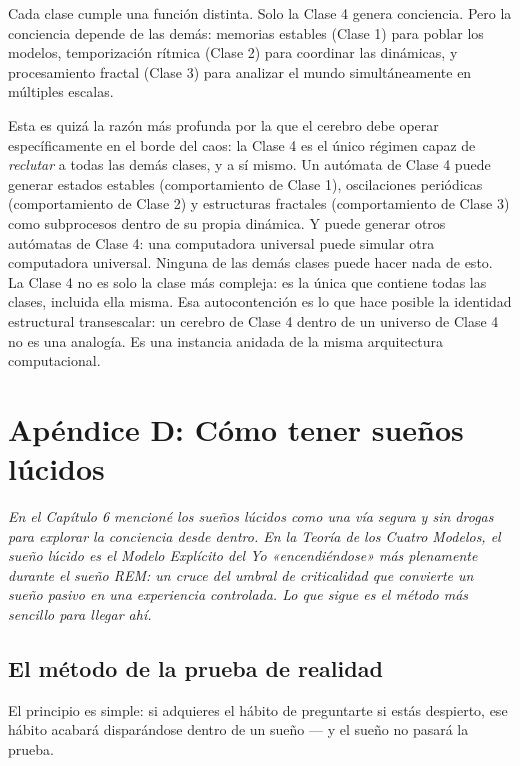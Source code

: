 \documentclass[11pt, twoside, openright]{book}
\begin{document}
Cada clase cumple una función distinta. Solo la Clase 4 genera conciencia. Pero la conciencia depende de las demás: memorias estables (Clase 1) para poblar los modelos, temporización rítmica (Clase 2) para coordinar las dinámicas, y procesamiento fractal (Clase 3) para analizar el mundo simultáneamente en múltiples escalas.

Esta es quizá la razón más profunda por la que el cerebro debe operar específicamente en el borde del caos: la Clase 4 es el único régimen capaz de \textit{reclutar} a todas las demás clases, y a sí mismo. Un autómata de Clase 4 puede generar estados estables (comportamiento de Clase 1), oscilaciones periódicas (comportamiento de Clase 2) y estructuras fractales (comportamiento de Clase 3) como subprocesos dentro de su propia dinámica. Y puede generar otros autómatas de Clase 4: una computadora universal puede simular otra computadora universal. Ninguna de las demás clases puede hacer nada de esto. La Clase 4 no es solo la clase más compleja: es la única que contiene todas las clases, incluida ella misma. Esa autocontención es lo que hace posible la identidad estructural transescalar: un cerebro de Clase 4 dentro de un universo de Clase 4 no es una analogía. Es una instancia anidada de la misma arquitectura computacional.


\chapter*{Apéndice D: Cómo tener sueños lúcidos}

\textit{En el Capítulo 6 mencioné los sueños lúcidos como una vía segura y sin drogas para explorar la conciencia desde dentro. En la Teoría de los Cuatro Modelos, el sueño lúcido es el Modelo Explícito del Yo «encendiéndose» más plenamente durante el sueño REM: un cruce del umbral de criticalidad que convierte un sueño pasivo en una experiencia controlada. Lo que sigue es el método más sencillo para llegar ahí.}

\section*{El método de la prueba de realidad}

El principio es simple: si adquieres el hábito de preguntarte si estás despierto, ese hábito acabará disparándose dentro de un sueño --- y el sueño no pasará la prueba.
\end{document}
